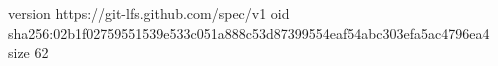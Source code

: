 version https://git-lfs.github.com/spec/v1
oid sha256:02b1f02759551539e533c051a888c53d87399554eaf54abc303efa5ac4796ea4
size 62
